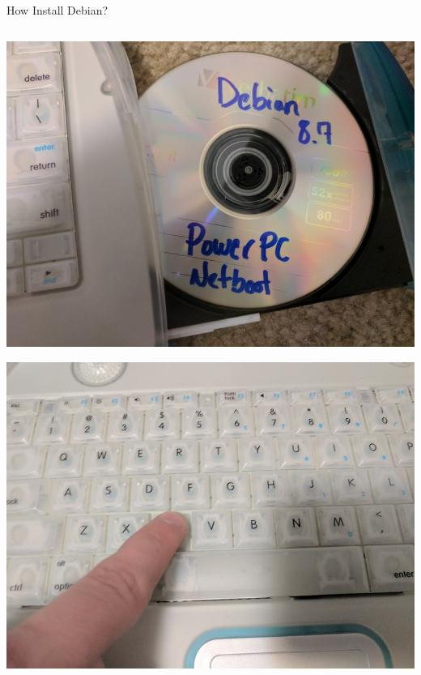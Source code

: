 \documentclass{lug}
\begin{document}
\begin{frame}{How Install Debian?}
\begin{columns}
\begin{column}{0.3\textwidth}
            \includegraphics[width=\textwidth]{graphics/cd}\par
            \includegraphics[width=\textwidth]{graphics/ckey}\par
        \end{column}
    \end{columns}
\end{frame}
\end{document}
